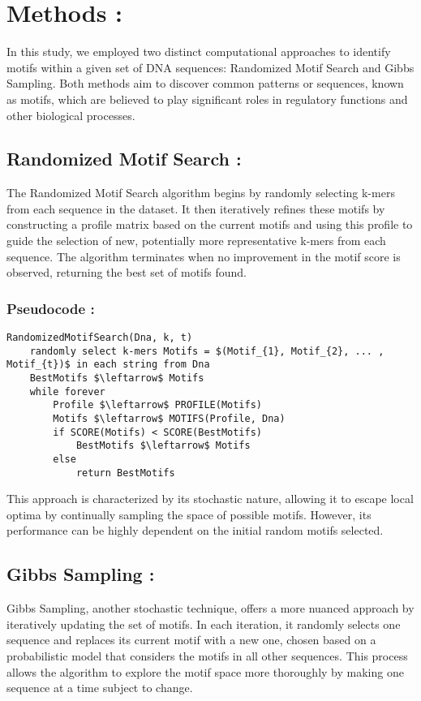 \section{Methods : }
In this study, we employed two distinct computational approaches to identify motifs within a given set of DNA sequences: Randomized Motif Search and Gibbs Sampling. Both methods aim to discover common patterns or sequences, known as motifs, which are believed to play significant roles in regulatory functions and other biological processes.

\subsection{Randomized Motif Search : }
The Randomized Motif Search algorithm begins by randomly selecting k-mers from each sequence in the dataset. It then iteratively refines these motifs by constructing a profile matrix based on the current motifs and using this profile to guide the selection of new, potentially more representative k-mers from each sequence. The algorithm terminates when no improvement in the motif score is observed, returning the best set of motifs found.
\subsubsection{Pseudocode : }
\begin{lstlisting}[caption=Pseudocode for Randomized Motif search, mathescape=true]
RandomizedMotifSearch(Dna, k, t)
    randomly select k-mers Motifs = $(Motif_{1}, Motif_{2}, ... , Motif_{t})$ in each string from Dna
    BestMotifs $\leftarrow$ Motifs
    while forever
        Profile $\leftarrow$ PROFILE(Motifs)
        Motifs $\leftarrow$ MOTIFS(Profile, Dna)
        if SCORE(Motifs) < SCORE(BestMotifs)
            BestMotifs $\leftarrow$ Motifs
        else
            return BestMotifs
\end{lstlisting}
This approach is characterized by its stochastic nature, allowing it to escape local optima by continually sampling the space of possible motifs. However, its performance can be highly dependent on the initial random motifs selected.



\subsection{Gibbs Sampling : }
Gibbs Sampling, another stochastic technique, offers a more nuanced approach by iteratively updating the set of motifs. In each iteration, it randomly selects one sequence and replaces its current motif with a new one, chosen based on a probabilistic model that considers the motifs in all other sequences. This process allows the algorithm to explore the motif space more thoroughly by making one sequence at a time subject to change.
